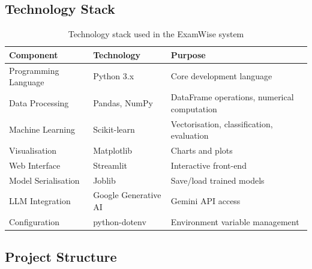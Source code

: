 \documentclass[12pt, a4paper]{article}
\begin{document}
\subsection{Technology Stack}

\begin{table}[H]
\centering
\caption{Technology stack used in the ExamWise system}
\label{tab:tech-stack}
\begin{tabular}{lll}
\toprule
\textbf{Component} & \textbf{Technology} & \textbf{Purpose} \\
\midrule
Programming Language & Python 3.x & Core development language \\
Data Processing & Pandas, NumPy & DataFrame operations, numerical computation \\
Machine Learning & Scikit-learn & Vectorisation, classification, evaluation \\
Visualisation & Matplotlib & Charts and plots \\
Web Interface & Streamlit & Interactive front-end \\
Model Serialisation & Joblib & Save/load trained models \\
LLM Integration & Google Generative AI & Gemini API access \\
Configuration & python-dotenv & Environment variable management \\
\bottomrule
\end{tabular}
\end{table}

\subsection{Project Structure}
\end{document}
